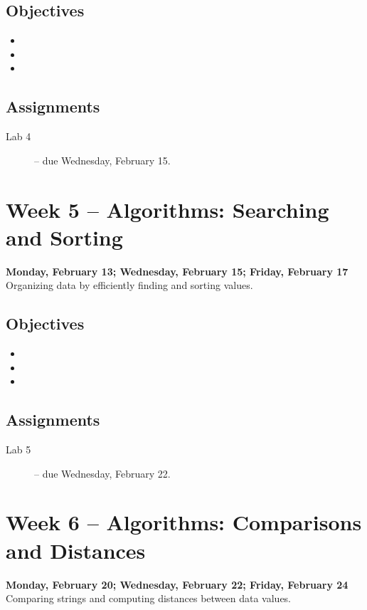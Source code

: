 \documentclass[10pt]{memoir}
\begin{document}
    \subsection{Objectives}
    \begin{itemize}
        \item 
        \item 
        \item 
    \end{itemize}

    \subsection{Assignments}
    \begin{description}%
        \item[Lab 4 ] -- due Wednesday, February 15.
    \end{description}

\section{Week 5 -- Algorithms: Searching and Sorting}
\textcolor{CUGold}{\textbf{Monday, February 13; Wednesday, February 15; Friday, February 17}}\\
Organizing data by efficiently finding and sorting values.

    \subsection{Objectives}
    \begin{itemize}
        \item 
        \item 
        \item 
    \end{itemize}

    \subsection{Assignments}
    \begin{description}%
        \item[Lab 5 ] -- due Wednesday, February 22.
    \end{description}

\section{Week 6 -- Algorithms: Comparisons and Distances}
\textcolor{CUGold}{\textbf{Monday, February 20; Wednesday, February 22; Friday, February 24}}\\
Comparing strings and computing distances between data values.
\end{document}
